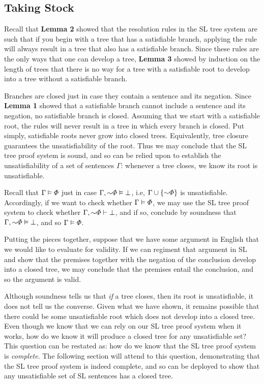 \label{sec.sl.soundnessproof.end}
\subsection{Taking Stock}

Recall that \textbf{Lemma 2} showed that the resolution rules in the SL tree system are such that if you begin with a tree that has a satisfiable branch, applying the rule will always result in a tree that also has a satisfiable branch.
Since these rules are the only ways that one can develop a tree, \textbf{Lemma 3} showed by induction on the length of trees that there is no way for a tree with a satisfiable root to develop into a tree without a satisfiable branch.

Branches are closed just in case they contain a sentence and its negation.
Since \textbf{Lemma 1} showed that a satisfiable branch cannot include a sentence and its negation, no satisfiable branch is closed.
Assuming that we start with a satisfiable root, the rules will never result in a tree in which every branch is closed.
Put simply, satisfiable roots never grow into closed trees.
Equivalently, tree closure guarantees the unsatisfiability of the root.
Thus we may conclude that the SL tree proof system is sound, and so can be relied upon to establish the unsatisfiability of a set of sentences $\Gamma$: whenever a tree closes, we know its root is unsatisfiable.

Recall that $\Gamma \vDash \varPhi$ just in case $\Gamma, \enot \metaA \models \bot$, i.e, $\Gamma \cup \set{\enot \metaA}$ is unsatisfiable.
Accordingly, if we want to check whether $\Gamma \vDash \varPhi$, we may use the SL tree proof system to check whether $\Gamma, \enot \metaA \proves \bot$, and if so, conclude by soundness that $\Gamma, \enot \metaA \models \bot$, and so $\Gamma \vDash \varPhi$.

Putting the pieces together, suppose that we have some argument in English that we would like to evaluate for validity.
If we can regiment that argument in SL and show that the premises together with the negation of the conclusion develop into a closed tree, we may conclude that the premises entail the conclusion, and so the argument is valid.

Although soundness tells us that \textit{if} a tree closes, then its root is unsatisfiable, it does not tell us the converse.
Given what we have shown, it remains possible that there could be some unsatisfiable root which does not develop into a closed tree.
Even though we know that we can rely on our SL tree proof system when it works, how do we know it will produce a closed tree for any unsatisfiable set?
This question can be restated as: how do we know that the SL tree proof system is \textit{complete}.
The following section will attend to this question, demonstrating that the SL tree proof system is indeed complete, and so can be deployed to show that any unsatisfiable set of SL sentences has a closed tree.



